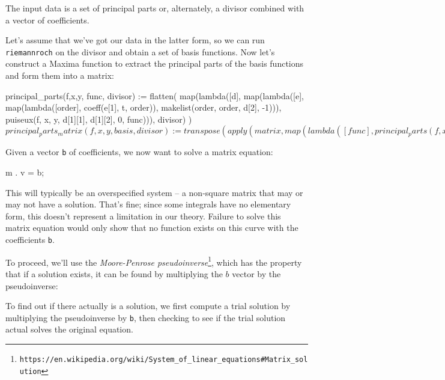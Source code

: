 The input data is a set of principal parts or, alternately, a divisor
combined with a vector of coefficients.

Let's assume that we've got our data in the latter form, so we can run
{\tt riemannroch} on the divisor and obtain a set of basis functions.
Now let's construct a Maxima function to extract the principal parts
of the basis functions and form them into a matrix:

\begin{maximablock}
principal_parts(f,x,y, func, divisor) :=
  flatten(
  map(lambda([d], map(lambda([e], map(lambda([order], coeff(e[1], t, order)), makelist(order, order, d[2], -1))),
                      puiseux(f, x, y, d[1][1], d[1][2], 0, func))), divisor)
  )
$

principal_parts_matrix(f,x,y, basis, divisor) :=
  transpose(apply(matrix, map(lambda([func], principal_parts(f,x,y,func,divisor)), basis)))
$
\end{maximablock}

Given a vector {\tt b} of coefficients, we now want to
solve a matrix equation:

\begin{maximablock}
m . v = b;
\end{maximablock}

This will typically be an overspecified system -- a non-square matrix
that may or may not have a solution.  That's fine; since some
integrals have no elementary form, this doesn't represent a limitation
in our theory.  Failure to solve this matrix equation would only show
that no function exists on this curve with the coefficients {\tt b}.

To proceed, we'll use the
{\it Moore-Penrose pseudoinverse}\footnote{\tt https://en.wikipedia.org/wiki/System_of_linear_equations\#Matrix_solution},
which has the property that if a solution exists, it can
be found by multiplying the $b$ vector by the pseudoinverse:


To find out if there actually is a solution, we first compute a trial
solution by multiplying the pseudoinverse by {\tt b}, then checking
to see if the trial solution actual solves the original equation.

